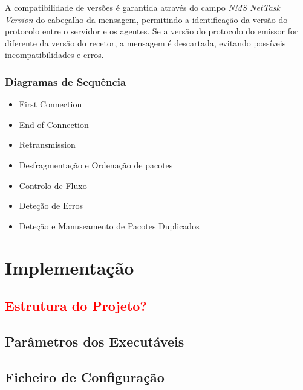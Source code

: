 \documentclass[a4paper,12pt]{scrreprt}
\begin{document}
A compatibilidade de versões é garantida através do campo \textit{NMS NetTask Version} do cabeçalho
da mensagem, permitindo a identificação da versão do protocolo entre o servidor e os agentes. Se a
versão do protocolo do emissor for diferente da versão do recetor, a mensagem é descartada, evitando
possíveis incompatibilidades e erros.

\subsection{Diagramas de Sequência}

\begin{itemize}
    \item First Connection
    \item End of Connection
    \item Retransmission
    \item Desfragmentação e Ordenação de pacotes
    \item Controlo de Fluxo
    \item Deteção de Erros
    \item Deteção e Manuseamento de Pacotes Duplicados
\end{itemize}



\chapter{Implementação}

\section{\textcolor{red}{Estrutura do Projeto?}}

\section{Parâmetros dos Executáveis}

\section{Ficheiro de Configuração}
\end{document}

